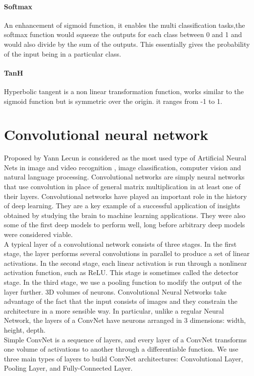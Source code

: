 \paragraph{Softmax} An enhancement of sigmoid function, it enables the multi classification
tasks,the softmax function would squeeze the outputs for each class between 0 and 1 and
would also divide by the sum of the outputs. This essentially gives the probability of the
input being in a particular class.

\paragraph{TanH} Hyperbolic tangent is a non linear transformation function, works similar to
the sigmoid function but is symmetric over the origin. it ranges from -1 to 1.

\section{Convolutional neural network}
Proposed by Yann Lecun \cite{art26} is considered as the most used type of Artificial Neural
Nets in image and video recognition , image classification, computer vision and natural
language processing.
Convolutional networks are simply neural networks that use
convolution in place of general matrix multiplication in at least one of their layers.
Convolutional networks have played an important role in the history of deep learning.
They are a key example of a successful application of insights obtained by studying the
brain to machine learning applications. They were also some of the first deep models to
perform well, long before arbitrary deep models were considered viable.\cite{art20}\\

A typical layer of a convolutional network consists of three stages. In the first stage,
the layer performs several convolutions in parallel to produce a set of linear activations.
In the second stage, each linear activation is run through a nonlinear activation function,
such as ReLU. This stage is sometimes called the detector stage. In the third stage, we use
a pooling function to modify the output of the layer further.\cite{art20} 3D volumes of neurons.
Convolutional Neural Networks take advantage of the fact that the input consists of
images and they constrain the architecture in a more sensible way. In particular, unlike a
regular Neural Network, the layers of a ConvNet have neurons arranged in 3 dimensions:
width, height, depth. \vspace{4mm} \\
Simple ConvNet is a sequence of layers, and every layer of a ConvNet transforms one
volume of activations to another through a differentiable function. We use three main
types of layers to build ConvNet architectures: Convolutional Layer, Pooling Layer, and
Fully-Connected Layer.

